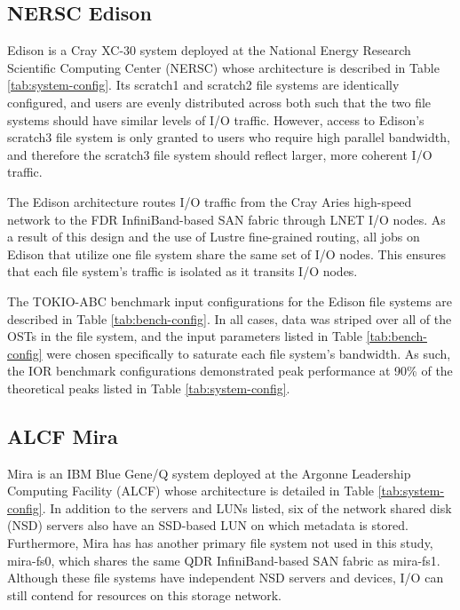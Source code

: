 \subsection{NERSC Edison} \label{sec:platforms/edison}

Edison is a Cray XC-30 system deployed at the National Energy Research Scientific Computing Center (NERSC) whose architecture is described in Table \ref{tab:system-config}.
Its scratch1 and scratch2 file systems are identically configured, and users are evenly distributed across both such that the two file systems should have similar levels of I/O traffic.
However, access to Edison's scratch3 file system is only granted to users who require high parallel bandwidth, and therefore the scratch3 file system should reflect larger, more coherent I/O traffic.

The Edison architecture routes I/O traffic from the Cray Aries high-speed network to the FDR InfiniBand-based SAN fabric through LNET I/O nodes.
As a result of this design and the use of Lustre fine-grained routing, all jobs on Edison that utilize one file system share the same set of I/O nodes.
This ensures that each file system's traffic is isolated as it transits I/O nodes.

The TOKIO-ABC benchmark input configurations for the Edison file systems are described in Table \ref{tab:bench-config}.
In all cases, data was striped over all of the OSTs in the file system, and the input parameters listed in Table \ref{tab:bench-config} were chosen specifically to saturate each file system's bandwidth.
As such, the IOR benchmark configurations demonstrated peak performance at 90\% of the theoretical peaks listed in Table \ref{tab:system-config}.

\subsection{ALCF Mira} \label{sec:platforms/mira}

Mira is an IBM Blue Gene/Q system deployed at the Argonne Leadership Computing Facility (ALCF) whose architecture is detailed in Table \ref{tab:system-config}.  In addition to the servers and LUNs listed, six of the network shared disk (NSD) servers also have an SSD-based LUN on which metadata is stored.  Furthermore, 
Mira has has another primary file system not used in this study, mira-fs0, which shares the same QDR InfiniBand-based SAN fabric as mira-fs1.
Although these file systems have independent NSD servers and devices, I/O can still contend for resources on this storage network.

